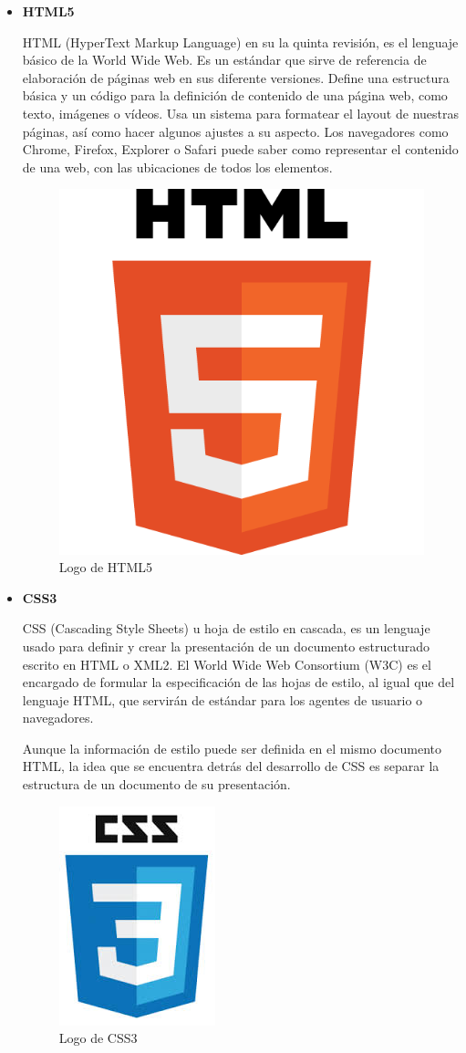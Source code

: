 \begin{itemize}
	\item \textbf{HTML5}
	
	HTML (HyperText Markup Language) \cite{html} en su la quinta revisión, es el lenguaje básico de la World Wide Web. Es un estándar que sirve de referencia de elaboración de páginas web en sus diferente versiones. Define una estructura básica y un código para la definición de contenido de una página web, como texto, imágenes o vídeos. Usa un sistema para formatear el layout de nuestras páginas, así como hacer algunos ajustes a su aspecto. Los navegadores como Chrome, Firefox, Explorer o Safari puede saber como representar el contenido de una web, con las ubicaciones de todos los elementos.
	
	
	\bigskip
	\begin{figure}[h]
		\centering
		\includegraphics[width=0.3\linewidth]{../images/htmllogo}
		\caption[Logo de HTML5]{Logo de HTML5}
		\label{fig:htmllogo}
	\end{figure}
	
	\item \textbf{CSS3}
		
	 CSS (Cascading Style Sheets) \cite{css} u hoja de estilo en cascada, es un lenguaje usado para definir y crear la presentación de un documento estructurado escrito en HTML o XML2. El World Wide Web Consortium (W3C) es el encargado de formular la especificación de las hojas de estilo, al igual que del lenguaje HTML, que servirán de estándar para los agentes de usuario o navegadores.

	 Aunque la información de estilo puede ser definida en el mismo documento HTML, la idea que se encuentra detrás del desarrollo de CSS es separar la estructura de un documento de su presentación. 

	
	\bigskip
	\begin{figure}[h]
		\centering
		\includegraphics[width=0.3\linewidth]{../images/csslogo}
		\caption[Logo de CSS3]{Logo de CSS3}
		\label{fig:csslogo}
	\end{figure}
		

\end{itemize}
